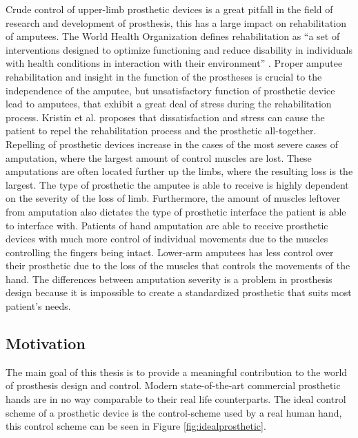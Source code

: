 \documentclass[../main.tex]{subfiles}
\begin{document}
Crude control of upper-limb prosthetic devices is a great pitfall in the field of research and development of prosthesis, this has a large impact on rehabilitation of amputees.
The World Health Organization defines rehabilitation as ``a set of interventions designed to optimize functioning and reduce disability in individuals with health conditions in interaction with their environment'' \cite{WHO_rehab}.
Proper amputee rehabilitation and insight in the function of the prostheses is crucial to the independence of the amputee, but unsatisfactory function of prosthetic device lead to amputees, that exhibit a great deal of stress during the rehabilitation process.
Kristin et al. \cite{Kristin2012} proposes that dissatisfaction and stress can cause the patient to repel the rehabilitation process and the prosthetic all-together.
Repelling of prosthetic devices increase in the cases of the most severe cases of amputation, where the largest amount of control muscles are lost.
These amputations are often located further up the limbs, where the resulting loss is the largest.
The type of prosthetic the amputee is able to receive is highly dependent on the severity of the loss of limb.
Furthermore, the amount of muscles leftover from amputation also dictates the type of prosthetic interface the patient is able to interface with.
Patients of hand amputation are able to receive prosthetic devices with much more control of individual movements due to the muscles controlling the fingers being intact. 
Lower-arm amputees has less control over their prosthetic due to the loss of the muscles that controls the movements of the hand.
The differences between amputation severity is a problem in prosthesis design because it is impossible to create a standardized prosthetic that suits most patient's needs.

\subsection{Motivation}

The main goal of this thesis is to provide a meaningful contribution to the world of prosthesis design and control.
Modern state-of-the-art commercial prosthetic hands are in no way comparable to their real life counterparts.
The ideal control scheme of a prosthetic device is the control-scheme used by a real human hand, this control scheme can be seen in Figure \ref{fig:idealprosthetic}.
\end{document}
